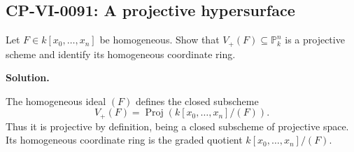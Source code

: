 
\subsection*{CP-VI-0091: A projective hypersurface}

Let $F\in k[x_0,\dots,x_n]$ be homogeneous. Show that $V_+(F)\subseteq\mathbb P_k^n$ is a projective scheme and identify its homogeneous coordinate ring.

\medskip
\noindent\textbf{Solution.}

The homogeneous ideal $(F)$ defines the closed subscheme
\[
V_+(F)=\operatorname{Proj}(k[x_0,\dots,x_n]/(F)).
\]
Thus it is projective by definition, being a closed subscheme of projective space. Its homogeneous coordinate ring is the graded quotient $k[x_0,\dots,x_n]/(F)$.
